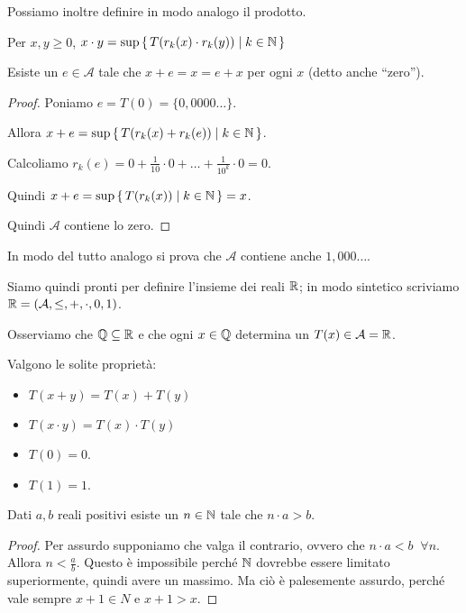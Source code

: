 Possiamo inoltre definire in modo analogo il prodotto.

Per $x, y \ge 0$, $x \cdot y = \sup \set{T(r_k(x) \cdot r_k(y)) | k \in \mathbb N}$

\begin{proposition}
Esiste un $e \in \mathcal{A}$ tale che $x + e = x = e + x$ per ogni $x$ (detto anche ``zero'').
\end{proposition}

\begin{proof}
Poniamo $e = T(0) = \{0,0000\dots\}$. 

Allora $x+e=\sup \set{T(r_k(x)+r_k(e)) | k \in \mathbb N}$.

Calcoliamo $r_k(e) = 0 + \frac{1}{10}\cdot 0 + \dots + \frac{1}{10^k}\cdot 0 = 0$.

Quindi $x + e = \sup \set{T(r_k(x)) | k \in \mathbb N} = x$.

Quindi $\mathcal{A}$ contiene lo zero.

\end{proof}

In modo del tutto analogo si prova che $\mathcal{A}$ contiene anche $1,000\dots$.

Siamo quindi pronti per definire l'insieme dei reali $\mathbb R$; in modo sintetico scriviamo $\mathbb R = (\mathcal{A}, \le, +, \cdot, 0, 1)$.

Osserviamo che $\mathbb Q \subseteq \mathbb R$ e che ogni $x \in \mathbb Q$ determina un $T(x) \in \mathcal{A} = \mathbb R$.

Valgono le solite proprietà:
\begin{itemize}
\item $T(x+y) = T(x) + T(y)$
\item $T(x \cdot y) = T(x) \cdot T(y)$
\item $T(0) = 0$.
\item $T(1) = 1$.
\end{itemize}

\begin{proposition}
Dati $a, b$ reali positivi esiste un $n \in \mathbb N$ tale che $n \cdot a > b$.
\end{proposition}

\begin{proof}
Per assurdo supponiamo che valga il contrario, ovvero che $n \cdot a < b \; \; \forall n$. Allora $n < \frac{a}{b}$. Questo è impossibile perché $\mathbb N$ dovrebbe essere limitato superiormente, quindi avere un massimo. Ma ciò è palesemente assurdo, perché vale sempre $x + 1 \in N$ e $x + 1 > x$.
\end{proof}

